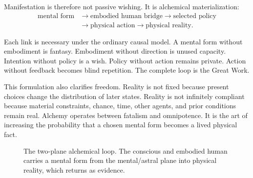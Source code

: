 \documentclass[11pt]{article}
\theoremstyle{plain}
\theoremstyle{definition}
\begin{document}
Manifestation is therefore not passive wishing. It is alchemical materialization:
\begin{equation}
\begin{aligned}
\text{mental form}
&\longrightarrow
\text{embodied human bridge}
\longrightarrow
\text{selected policy}\\
&\longrightarrow
\text{physical action}
\longrightarrow
\text{physical reality}.
\end{aligned}
\label{eq:causal-chain}
\end{equation}

Each link is necessary under the ordinary causal model. A mental form without
embodiment is fantasy. Embodiment without direction is unused capacity. Intention
without policy is a wish. Policy without action remains private. Action without
feedback becomes blind repetition. The complete loop is the Great Work.

This formulation also clarifies freedom. Reality is not fixed because present choices
change the distribution of later states. Reality is not infinitely compliant because
material constraints, chance, time, other agents, and prior conditions remain real.
Alchemy operates between fatalism and omnipotence. It is the art of increasing the
probability that a chosen mental form becomes a lived physical fact.

\begin{figure}[t]
\centering
{}
\caption{The two-plane alchemical loop. The conscious and embodied human carries a
mental form from the mental/astral plane into physical reality, which returns as
evidence.}
\label{fig:alchemical-loop}
\end{figure}
\end{document}

